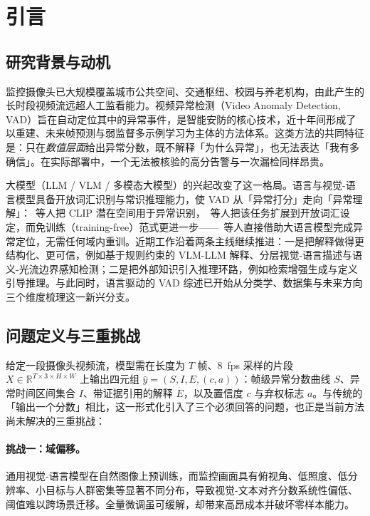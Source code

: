 \section{引言}
\label{sec:intro}

\subsection{研究背景与动机}

监控摄像头已大规模覆盖城市公共空间、交通枢纽、校园与养老机构，由此产生的长时段视频流远超人工监看能力。视频异常检测（Video Anomaly Detection, VAD）旨在自动定位其中的异常事件，是智能安防的核心技术，近十年间形成了以重建、未来帧预测与弱监督多示例学习为主体的方法体系\cite{abdalla2025vad10years,pravalika2026surveillance,houssein2026violence}。这类方法的共同特征是：只在\emph{数值层面}给出异常分数，既不解释「为什么异常」，也无法表达「我有多确信」。在实际部署中，一个无法被核验的高分告警与一次漏检同样昂贵。

大模型（LLM / VLM / 多模态大模型）的兴起改变了这一格局。语言与视觉-语言模型具备开放词汇识别与常识推理能力，使 VAD 从「异常打分」走向「异常理解」：\citeauthor{zanella2024clip}~等人把 CLIP 潜在空间用于异常识别\cite{zanella2024clip}，\citeauthor{wu2024openvocab}~等人把该任务扩展到开放词汇设定\cite{wu2024openvocab}，而免训练（training-free）范式更进一步——\citeauthor{zanella2024trainingfree}~等人直接借助大语言模型完成异常定位，无需任何域内重训\cite{zanella2024trainingfree}。近期工作沿着两条主线继续推进：一是把解释做得更结构化、更可信，例如基于规则约束的 VLM-LLM 解释\cite{khedher2025trustworthy}、分层视觉-语言描述\cite{alradi2026hierarchical}与语义-光流边界感知检测\cite{sun2026sorbdnet}；二是把外部知识引入推理环路，例如检索增强生成\cite{sun2026rag4vad}与定义引导推理\cite{pei2026drvad}。与此同时，语言驱动的 VAD 综述已开始从分类学、数据集与未来方向三个维度梳理这一新兴分支\cite{saket2026languagedriven}。

\subsection{问题定义与三重挑战}

给定一段摄像头视频流，模型需在长度为 $T$ 帧、$8$~fps 采样的片段 $X \in \mathbb{R}^{T \times 3 \times H \times W}$ 上输出四元组 $\hat{y} = (S, I, E, (c, a))$：帧级异常分数曲线 $S$、异常时间区间集合 $I$、带证据引用的解释 $E$，以及置信度 $c$ 与弃权标志 $a$。与传统的「输出一个分数」相比，这一形式化引入了三个必须回答的问题，也正是当前方法尚未解决的三重挑战：

\paragraph{挑战一：域偏移。} 通用视觉-语言模型在自然图像上预训练，而监控画面具有俯视角、低照度、低分辨率、小目标与人群密集等显著不同分布，导致视觉-文本对齐分数系统性偏低、阈值难以跨场景迁移。全量微调虽可缓解，却带来高昂成本并破坏零样本能力。

